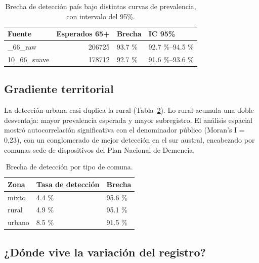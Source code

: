\documentclass[
  spanish,
  letterpaper,
  DIV=11,
  numbers=noendperiod]{scrartcl}
\begin{document}
{

\begin{longtable}[]{@{}lrll@{}}

\caption{\label{tbl-sens}Brecha de detección país bajo distintas curvas
de prevalencia, con intervalo del 95\%.}

\tabularnewline

\toprule\noalign{}
Fuente & Esperados 65+ & Brecha & IC 95\% \\
\midrule\noalign{}
\endhead
\bottomrule\noalign{}
\endlastfoot
10\_66\_raw & 206725 & 93.7 \% & 92.7 \%--94.5 \% \\
10\_66\_suave & 178712 & 92.7 \% & 91.6 \%--93.6 \% \\

\end{longtable}

}

\subsection{Gradiente territorial}\label{gradiente-territorial}

La detección urbana casi duplica la rural (Tabla~\ref{tbl-zona}). Lo
rural acumula una doble desventaja: mayor prevalencia esperada y mayor
subregistro. El análisis espacial mostró autocorrelación significativa
con el denominador público (Moran's I = 0,23), con un conglomerado de
mejor detección en el sur austral, encabezado por comunas sede de
dispositivos del Plan Nacional de Demencia.

{

\begin{longtable}[]{@{}lll@{}}

\caption{\label{tbl-zona}Brecha de detección por tipo de comuna.}

\tabularnewline

\toprule\noalign{}
Zona & Tasa de detección & Brecha \\
\midrule\noalign{}
\endhead
\bottomrule\noalign{}
\endlastfoot
mixto & 4.4 \% & 95.6 \% \\
rural & 4.9 \% & 95.1 \% \\
urbano & 8.5 \% & 91.5 \% \\

\end{longtable}

}

\subsection{¿Dónde vive la variación del
registro?}\label{duxf3nde-vive-la-variaciuxf3n-del-registro}
\end{document}
